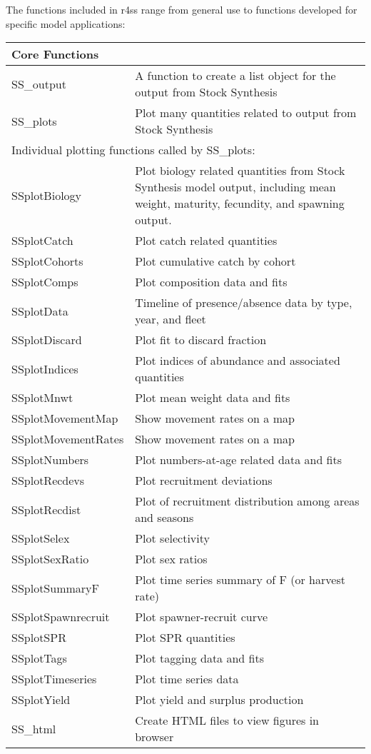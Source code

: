 \pagebreak
The functions included in r4ss range from general use to functions developed for specific model applications:
\begin{center}
	\begin{longtable}{p{4.5cm} p{10.52cm}}
		\hline
		Core Functions & \Tstrut\Bstrut\\
		\hline
		SS\_output \Tstrut& A function to create a list object for the output from Stock Synthesis\\
		SS\_plots  \Tstrut& Plot many quantities related to output from Stock Synthesis\\
		\hline
		
		\multicolumn{2}{l}{Individual plotting functions called by SS\_plots:} \Tstrut\Bstrut\\
		\hline
		SSplotBiology \Tstrut& Plot biology related quantities from Stock Synthesis model output, including mean weight, maturity, fecundity, and spawning output. \\
		SSplotCatch   \Tstrut & Plot catch related quantities \\
		SSplotCohorts \Tstrut & Plot cumulative catch by cohort \\
		SSplotComps   \Tstrut & Plot composition data and fits \\
		SSplotData    \Tstrut & Timeline of presence/absence data by type, year, and fleet \\
		SSplotDiscard \Tstrut & Plot fit to discard fraction \\
		SSplotIndices \Tstrut & Plot indices of abundance and associated quantities \\
		SSplotMnwt    \Tstrut & Plot mean weight data and fits \\
		SSplotMovementMap \Tstrut & Show movement rates on a map \\
		SSplotMovementRates \Tstrut & Show movement rates on a map \\
		SSplotNumbers \Tstrut& Plot numbers-at-age related data and fits \\
		SSplotRecdevs \Tstrut& Plot recruitment deviations \\
		SSplotRecdist \Tstrut& Plot of recruitment distribution among areas and seasons \\
		SSplotSelex   \Tstrut& Plot selectivity \\
		SSplotSexRatio \Tstrut& Plot sex ratios \\
		SSplotSummaryF \Tstrut& Plot time series summary of F (or harvest rate) \\
		SSplotSpawnrecruit \Tstrut& Plot spawner-recruit curve \\
		SSplotSPR     \Tstrut& Plot SPR quantities \\
		SSplotTags    \Tstrut& Plot tagging data and fits \\
		SSplotTimeseries \Tstrut& Plot time series data \\
		SSplotYield   \Tstrut& Plot yield and surplus production \\
		SS\_html \Tstrut& Create HTML files to view figures in browser \\
		\hline
	

\end{longtable}
\end{center}
